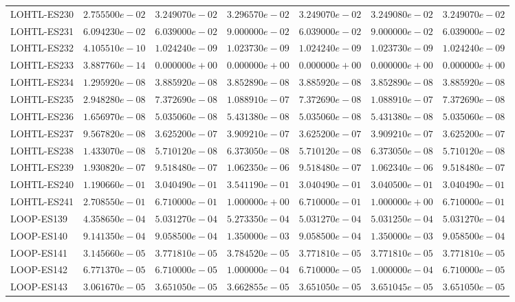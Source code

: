 \begin{longtable}{lrrrrrr}
LOHTL-ES230 & $2.755500e-02$ & $3.249070e-02$ & $3.296570e-02$ & $3.249070e-02$ & $3.249080e-02$ & $3.249070e-02$ \\
LOHTL-ES231 & $6.094230e-02$ & $6.039000e-02$ & $9.000000e-02$ & $6.039000e-02$ & $9.000000e-02$ & $6.039000e-02$ \\
LOHTL-ES232 & $4.105510e-10$ & $1.024240e-09$ & $1.023730e-09$ & $1.024240e-09$ & $1.023730e-09$ & $1.024240e-09$ \\
LOHTL-ES233 & $3.887760e-14$ & $0.000000e+00$ & $0.000000e+00$ & $0.000000e+00$ & $0.000000e+00$ & $0.000000e+00$ \\
LOHTL-ES234 & $1.295920e-08$ & $3.885920e-08$ & $3.852890e-08$ & $3.885920e-08$ & $3.852890e-08$ & $3.885920e-08$ \\
LOHTL-ES235 & $2.948280e-08$ & $7.372690e-08$ & $1.088910e-07$ & $7.372690e-08$ & $1.088910e-07$ & $7.372690e-08$ \\
LOHTL-ES236 & $1.656970e-08$ & $5.035060e-08$ & $5.431380e-08$ & $5.035060e-08$ & $5.431380e-08$ & $5.035060e-08$ \\
LOHTL-ES237 & $9.567820e-08$ & $3.625200e-07$ & $3.909210e-07$ & $3.625200e-07$ & $3.909210e-07$ & $3.625200e-07$ \\
LOHTL-ES238 & $1.433070e-08$ & $5.710120e-08$ & $6.373050e-08$ & $5.710120e-08$ & $6.373050e-08$ & $5.710120e-08$ \\
LOHTL-ES239 & $1.930820e-07$ & $9.518480e-07$ & $1.062350e-06$ & $9.518480e-07$ & $1.062340e-06$ & $9.518480e-07$ \\
LOHTL-ES240 & $1.190660e-01$ & $3.040490e-01$ & $3.541190e-01$ & $3.040490e-01$ & $3.040500e-01$ & $3.040490e-01$ \\
LOHTL-ES241 & $2.708550e-01$ & $6.710000e-01$ & $1.000000e+00$ & $6.710000e-01$ & $1.000000e+00$ & $6.710000e-01$ \\
LOOP-ES139 & $4.358650e-04$ & $5.031270e-04$ & $5.273350e-04$ & $5.031270e-04$ & $5.031250e-04$ & $5.031270e-04$ \\
LOOP-ES140 & $9.141350e-04$ & $9.058500e-04$ & $1.350000e-03$ & $9.058500e-04$ & $1.350000e-03$ & $9.058500e-04$ \\
LOOP-ES141 & $3.145660e-05$ & $3.771810e-05$ & $3.784520e-05$ & $3.771810e-05$ & $3.771810e-05$ & $3.771810e-05$ \\
LOOP-ES142 & $6.771370e-05$ & $6.710000e-05$ & $1.000000e-04$ & $6.710000e-05$ & $1.000000e-04$ & $6.710000e-05$ \\
LOOP-ES143 & $3.061670e-05$ & $3.651050e-05$ & $3.662855e-05$ & $3.651050e-05$ & $3.651045e-05$ & $3.651050e-05$ \\

\end{longtable}
